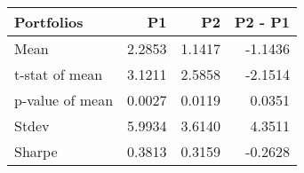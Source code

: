 \begin{tabular}{lrrr}
\toprule
Portfolios & P1 & P2 & P2 - P1 \\
\midrule
Mean & 2.2853 & 1.1417 & -1.1436 \\
t-stat of mean & 3.1211 & 2.5858 & -2.1514 \\
p-value of mean & 0.0027 & 0.0119 & 0.0351 \\
Stdev & 5.9934 & 3.6140 & 4.3511 \\
Sharpe & 0.3813 & 0.3159 & -0.2628 \\
\bottomrule
\end{tabular}
